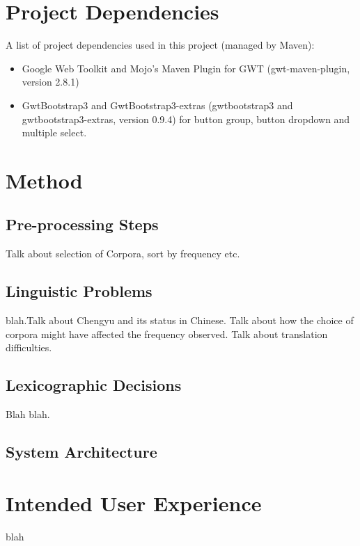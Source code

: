 \documentclass[11pt]{article} %
\begin{document}
\section{Project Dependencies}
A list of project dependencies used in this project (managed by Maven):
\begin{itemize}
\item Google Web Toolkit and Mojo's Maven Plugin for GWT  (gwt-maven-plugin, version 2.8.1)
\item GwtBootstrap3 and GwtBootstrap3-extras (gwtbootstrap3 and gwtbootstrap3-extras, version 0.9.4) for button group, button dropdown and multiple select.
\end{itemize}

\section{Method}
\subsection{Pre-processing Steps}
\indent Talk about selection of Corpora, sort by frequency etc.\\

\subsection{Linguistic Problems}

\indent blah.Talk about Chengyu and its status in Chinese. Talk about how the choice of corpora might have affected the frequency observed. Talk about translation difficulties.\\

\subsection{Lexicographic Decisions}

\indent Blah blah.\\

\subsection{System Architecture}

\section{Intended User Experience}

\indent blah\\
\end{document}
